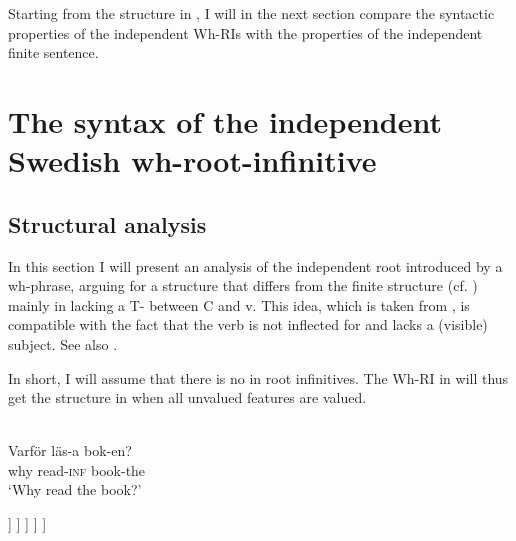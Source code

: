\documentclass[output=paper]{LSP/langsci}
\begin{document}
Starting from the structure in , I will in the next section compare the syntactic properties of the independent  Wh-RIs with the properties of the independent  finite sentence.    

\section{The syntax of the independent  Swedish wh-root-infinitive}\label{sec:platzack:4}

\subsection{ Structural analysis} 

In this section I will present an analysis of the independent  root  introduced by a wh-phrase, arguing for a structure that differs from the finite structure (cf. ) mainly in lacking a T- between C and v. This idea, which is taken from \citet{Reis2003}, is compatible with the fact that the  verb is not inflected for  and lacks a (visible) subject. See also \citet{PlatzackRosengren2017}.

   In short, I will assume that there is no  in root infinitives. The Wh-RI in  will thus get the structure in  when all unvalued features are valued.

\ea%
    \label{ex:platzack:17}
	  \\
\gll Varför  läs-a    bok-en?\\
why      read-\textsc{inf}  book-the \\
\glt ‘Why read the book?’
\z

\ea%
    \label{ex:platzack:18}
    \begin{forest}
     [CP\is{complementizer}, for tree={align=center, base=top, parent anchor=south, child anchor=north}
      [varför\\{[}wh{]}] [C'
	[{[wh]}\\{[inf]}] [vP
	  [\st{varför}] [vP
	    [DP\\{[ϕ]}] [v'
	      [v\\läsa\\{[inf]}] [DP\\boken\\{[ϕ]}]
	    ]
	  ]
	]
     ]
    ]
    \end{forest}
\z
\end{document}
